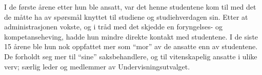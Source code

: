 I de første årene etter hun ble ansatt, var det henne studentene kom til med det de måtte ha av spørsmål knyttet til studiene og studiehverdagen sin. Etter at administrasjonen vokste, og i tråd med det skjedde en foryngelses- og kompetanseheving, hadde hun mindre direkte kontakt med studentene. I de siste 15 årene ble hun nok oppfattet mer som ``mor'' av de ansatte enn av studentene. De forholdt seg mer til ``sine'' saksbehandlere, og til vitenskapelig ansatte i ulike verv; særlig leder og medlemmer av Undervisningsutvalget.
